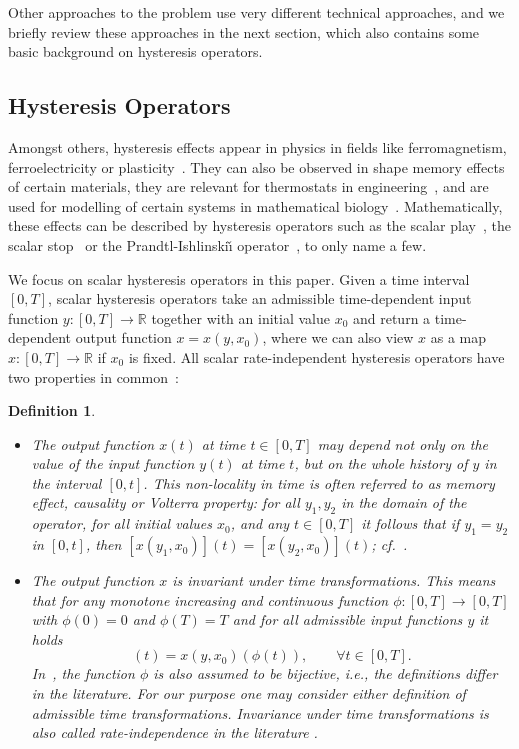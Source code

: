 \documentclass[12pt]{article}
\newtheorem{defn}[thm]{Definition}
\def\R{\mathbb{R}}
\newcommand{\benn}{\begin{equation*}}
\newcommand{\eenn}{\end{equation*}}
\begin{document}
Other approaches to the problem use very different technical approaches, and we
briefly review these approaches in the next section, which also contains some 
basic background on hysteresis operators.

\subsection{Hysteresis Operators}
\label{ssec:hysteresis}

Amongst others, hysteresis effects appear in physics in fields like ferromagnetism, 
ferroelectricity or 
plasticity~\cite{Mayergoyz,BrokateSprekels,KrasnoselskiiPokrovskii,Visintin,MielkeRoubicek}. 
They can also be observed in shape memory effects of certain materials, they are relevant for 
thermostats in engineering~\cite{Visintin}, and are used for modelling of certain systems
in mathematical biology~\cite{GurevichShaminTikhomirov,HoppensteadtJaeger,Kopfova,
Pimenovetal,CurranGurevichTikhomirov}. Mathematically, these effects can be described 
by hysteresis operators such as the scalar play~\cite{BrokateKrejci}, the scalar 
stop~\cite{BrokateRachinskii} or the Prandtl-Ishlinski\v{\i} operator~\cite{Kuhnen}, 
to only name a few.\medskip 

We focus on scalar hysteresis operators in this paper. Given a time interval $[0,T]$, 
scalar hysteresis operators take an admissible time-dependent input 
function $y:[0,T]\rightarrow \R$ together with an initial value $x_0$ and return 
a time-dependent output function $x=x(y,x_0)$, where we can also view $x$ as a 
map $x:[0,T]\rightarrow\R $ if $x_0$ is fixed. All scalar rate-independent hysteresis 
operators have two properties in common~\cite{Visintin,BrokateSprekels}:
\begin{defn}
\leavevmode
\begin{itemize}
	\item[(Vol)] The output function $x(t)$ at time $t\in [0,T]$ may depend not only on the value of 
	the input function $y(t)$ at time $t$, but on the whole history of $y$ in the interval 
	$[0,t]$. This non-locality in time is often referred to as memory effect, causality or 
	Volterra property: for all $y_1,y_2$ in the domain of the operator, for all initial values
	$x_0$, and any $t\in [0,T]$ it follows that if $y_1=y_2$ in $[0,t]$, then 
	$[x(y_1,x_0)](t)=[x(y_2,x_0)](t)$; cf.~\cite[Chapter~III]{Visintin}. 
	\item[(RI)] The output function $x$ is invariant under time transformations. This means that 
	for any monotone increasing and continuous function $\phi:[0,T]\rightarrow [0,T]$ with 
	$\phi(0)=0$ and $\phi(T)=T$ and for all admissible input functions $y$ it holds
	\benn
	[x(y\circ\phi,x_0)](t)=x(y,x_0)(\phi(t)),\qquad \forall t\in[0,T].
	\eenn
	In~\cite[Chapter III]{Visintin}, the function $\phi$ is also assumed to be bijective,
	i.e., the definitions differ in the literature. For our purpose one may consider either
	definition of admissible time transformations. Invariance under time transformations 
	is also called rate-independence in the literature \cite[Definition 1.2.1]{MielkeRoubicek}.
\end{itemize}
\end{defn}
\end{document}
